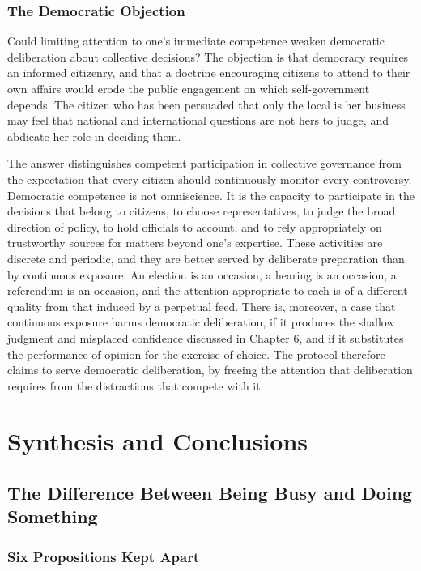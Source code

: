 \documentclass[11pt]{report}
\theoremstyle{definition}
\theoremstyle{remark}
\begin{document}
\section{The Democratic Objection}

Could limiting attention to one's immediate competence weaken democratic deliberation about collective decisions? The objection is that democracy requires an informed citizenry, and that a doctrine encouraging citizens to attend to their own affairs would erode the public engagement on which self-government depends. The citizen who has been persuaded that only the local is her business may feel that national and international questions are not hers to judge, and abdicate her role in deciding them.

The answer distinguishes competent participation in collective governance from the expectation that every citizen should continuously monitor every controversy. Democratic competence is not omniscience. It is the capacity to participate in the decisions that belong to citizens, to choose representatives, to judge the broad direction of policy, to hold officials to account, and to rely appropriately on trustworthy sources for matters beyond one's expertise. These activities are discrete and periodic, and they are better served by deliberate preparation than by continuous exposure. An election is an occasion, a hearing is an occasion, a referendum is an occasion, and the attention appropriate to each is of a different quality from that induced by a perpetual feed. There is, moreover, a case that continuous exposure harms democratic deliberation, if it produces the shallow judgment and misplaced confidence discussed in Chapter 6, and if it substitutes the performance of opinion for the exercise of choice. The protocol therefore claims to serve democratic deliberation, by freeing the attention that deliberation requires from the distractions that compete with it.

\part{Synthesis and Conclusions}

\chapter{The Difference Between Being Busy and Doing Something}

\section{Six Propositions Kept Apart}
\end{document}

